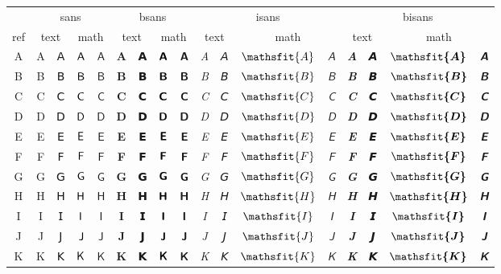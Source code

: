 \documentclass{standalone}
\newcommand{\SANS}[1]{\ifmmode\mathsf{#1}\else\textsf{#1}\fi}
\newcommand{\BSANS}[1]{\ifmmode\boldsymbol{\mathsf{#1}}\else\textbf{\textsf{#1}}\fi}
\newcommand{\ISANS}[1]{\ifmmode\mathsfit{#1}\else\textit{\textsf{#1}}\fi}
\newcommand{\BISANS}[1]{\ifmmode\bm{\mathsfit{#1}}\else\textbf{\textsf{\textit{#1}}}\fi}
\begin{document}
\begin{tabular}{c|cc|cc|cc|cc|cc|cc|cc|cc}
\toprule
&\multicolumn{4}{c|}{sans} & \multicolumn{4}{|c}{bsans} & \multicolumn{4}{|c}{isans} & \multicolumn{4}{|c}{bisans}\\
ref&\multicolumn{2}{c|}{text} & \multicolumn{2}{|c|}{math} & \multicolumn{2}{|c|}{text} & \multicolumn{2}{|c}{math}
& \multicolumn{2}{|c|}{text} & \multicolumn{2}{|c}{math} & \multicolumn{2}{|c|}{text} & \multicolumn{2}{|c}{math} \\
\midrule
A & \SANS{A} & 𝖠 & $\SANS{A}$ & $𝖠$ & \BSANS{A} & 𝗔 & $\BSANS{A}$ & $𝗔$ & \ISANS{A} & 𝘈 & $\ISANS{A}$ & $𝘈$ & \BISANS{A} & 𝘼 & $\BISANS{A}$ & $𝘼$  \\
B & \SANS{B} & 𝖡 & $\SANS{B}$ & $𝖡$ & \BSANS{B} & 𝗕 & $\BSANS{B}$ & $𝗕$ & \ISANS{B} & 𝘉 & $\ISANS{B}$ & $𝘉$ & \BISANS{B} & 𝘽 & $\BISANS{B}$ & $𝘽$  \\
C & \SANS{C} & 𝖢 & $\SANS{C}$ & $𝖢$ & \BSANS{C} & 𝗖 & $\BSANS{C}$ & $𝗖$ & \ISANS{C} & 𝘊 & $\ISANS{C}$ & $𝘊$ & \BISANS{C} & 𝘾 & $\BISANS{C}$ & $𝘾$  \\
D & \SANS{D} & 𝖣 & $\SANS{D}$ & $𝖣$ & \BSANS{D} & 𝗗 & $\BSANS{D}$ & $𝗗$ & \ISANS{D} & 𝘋 & $\ISANS{D}$ & $𝘋$ & \BISANS{D} & 𝘿 & $\BISANS{D}$ & $𝘿$  \\
E & \SANS{E} & 𝖤 & $\SANS{E}$ & $𝖤$ & \BSANS{E} & 𝗘 & $\BSANS{E}$ & $𝗘$ & \ISANS{E} & 𝘌 & $\ISANS{E}$ & $𝘌$ & \BISANS{E} & 𝙀 & $\BISANS{E}$ & $𝙀$  \\
F & \SANS{F} & 𝖥 & $\SANS{F}$ & $𝖥$ & \BSANS{F} & 𝗙 & $\BSANS{F}$ & $𝗙$ & \ISANS{F} & 𝘍 & $\ISANS{F}$ & $𝘍$ & \BISANS{F} & 𝙁 & $\BISANS{F}$ & $𝙁$  \\
G & \SANS{G} & 𝖦 & $\SANS{G}$ & $𝖦$ & \BSANS{G} & 𝗚 & $\BSANS{G}$ & $𝗚$ & \ISANS{G} & 𝘎 & $\ISANS{G}$ & $𝘎$ & \BISANS{G} & 𝙂 & $\BISANS{G}$ & $𝙂$  \\
H & \SANS{H} & 𝖧 & $\SANS{H}$ & $𝖧$ & \BSANS{H} & 𝗛 & $\BSANS{H}$ & $𝗛$ & \ISANS{H} & 𝘏 & $\ISANS{H}$ & $𝘏$ & \BISANS{H} & 𝙃 & $\BISANS{H}$ & $𝙃$  \\
I & \SANS{I} & 𝖨 & $\SANS{I}$ & $𝖨$ & \BSANS{I} & 𝗜 & $\BSANS{I}$ & $𝗜$ & \ISANS{I} & 𝘐 & $\ISANS{I}$ & $𝘐$ & \BISANS{I} & 𝙄 & $\BISANS{I}$ & $𝙄$  \\
J & \SANS{J} & 𝖩 & $\SANS{J}$ & $𝖩$ & \BSANS{J} & 𝗝 & $\BSANS{J}$ & $𝗝$ & \ISANS{J} & 𝘑 & $\ISANS{J}$ & $𝘑$ & \BISANS{J} & 𝙅 & $\BISANS{J}$ & $𝙅$  \\
K & \SANS{K} & 𝖪 & $\SANS{K}$ & $𝖪$ & \BSANS{K} & 𝗞 & $\BSANS{K}$ & $𝗞$ & \ISANS{K} & 𝘒 & $\ISANS{K}$ & $𝘒$ & \BISANS{K} & 𝙆 & $\BISANS{K}$ & $𝙆$  \\

\end{tabular}
\end{document}
